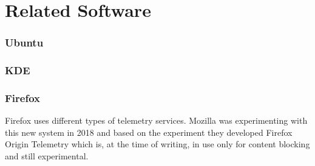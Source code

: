 \section{Related Software}
\label{sec:related_work:related_sw}
%

\subsubsection{Ubuntu}

\subsubsection{KDE}

\subsubsection{Firefox}
    Firefox uses different types of telemetry services. 
    Mozilla was experimenting with this new system in 2018 \cite{helmer_testing_2018} and based on the experiment they developed Firefox Origin Telemetry\cite{englehardt_next_2019} which is, at the time of writing, in use only for content blocking and still experimental\cite{noauthor_origin_nodate}.\\
    


